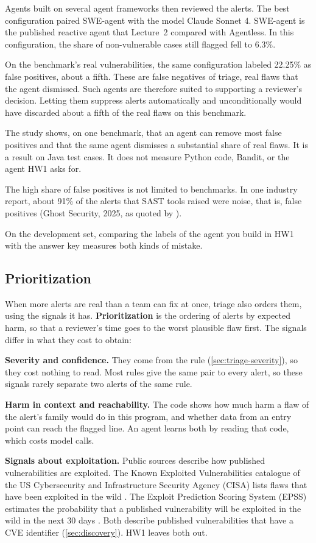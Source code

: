Agents built on several agent frameworks then reviewed the alerts. The best configuration paired
SWE-agent with the model Claude Sonnet 4. SWE-agent is the published reactive agent that Lecture~2
compared with Agentless. In this configuration, the share of non-vulnerable cases still flagged fell
to 6.3\%.

On the benchmark's real vulnerabilities, the same configuration labeled 22.25\% as false positives,
about a fifth. These are false negatives of triage, real flaws that the agent dismissed. Such agents
are therefore suited to supporting a reviewer's decision. Letting them suppress alerts automatically
and unconditionally would have discarded about a fifth of the real flaws on this benchmark.

The study shows, on one benchmark, that an agent can remove most false positives and that the same
agent dismisses a substantial share of real flaws. It is a result on Java test cases. It does not
measure Python code, Bandit, or the agent HW1 asks for.

The high share of false positives is not limited to benchmarks. In one industry report, about 91\%
of the alerts that SAST tools raised were noise, that is, false positives (Ghost Security, 2025, as
quoted by \citet{feiglin2026sastbench}).

On the development set, comparing the labels of the agent you build in HW1 with the answer key
measures both kinds of mistake.

\subsection{Prioritization}
\label{sec:triage-priority}

When more alerts are real than a team can fix at once, triage also orders them, using the signals it
has. \textbf{Prioritization} is the ordering of alerts by expected harm, so that a reviewer's time
goes to the worst plausible flaw first. The signals differ in what they cost to obtain:
\bi
\item \textbf{Severity and confidence.} They come from the rule (\cref{sec:triage-severity}), so they
cost nothing to read. Most rules give the same pair to every alert, so these signals rarely separate
two alerts of the same rule.
\item \textbf{Harm in context and reachability.} The code shows how much harm a flaw of the alert's
family would do in this program, and whether data from an entry point can reach the flagged line. An
agent learns both by reading that code, which costs model calls.
\item \textbf{Signals about exploitation.} Public sources describe how published vulnerabilities are
exploited. The Known Exploited Vulnerabilities catalogue of the US Cybersecurity and Infrastructure
Security Agency (CISA) lists flaws that have been exploited in the wild \citep{cisa-kev}. The Exploit
Prediction Scoring System (EPSS) estimates the probability that a published vulnerability will be
exploited in the wild in the next 30 days \citep{first-epss}. Both describe published
vulnerabilities that have a CVE identifier (\cref{sec:discovery}). HW1 leaves both out.
\ei

